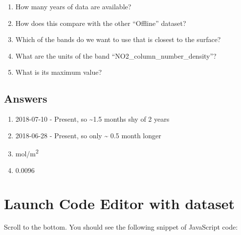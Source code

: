 \documentclass[]{book}
\providecommand{\tightlist}{%
  \setlength{\itemsep}{0pt}\setlength{\parskip}{0pt}}
\begin{document}
\begin{enumerate}
\def\labelenumi{\arabic{enumi}.}
\tightlist
\item
  How many years of data are available?
\item
  How does this compare with the other ``Offline'' dataset?
\item
  Which of the bands do we want to use that is closest to the surface?
\item
  What are the units of the band ``NO2\_column\_number\_density''?
\item
  What is its maximum value?
\end{enumerate}

\hypertarget{answers}{%
\subsection{Answers}\label{answers}}

\begin{enumerate}
\def\labelenumi{\arabic{enumi}.}
\tightlist
\item
  2018-07-10 - Present, so \textasciitilde{}1.5 months shy of 2 years
\item
  2018-06-28 - Present, so only \textasciitilde{} 0.5 month longer
\item
  mol/m\textsuperscript{2}
\item
  0.0096
\end{enumerate}

\hypertarget{launch-code-editor-with-dataset}{%
\section{Launch Code Editor with dataset}\label{launch-code-editor-with-dataset}}

Scroll to the bottom. You should see the following snippet of JavaScript code:
\end{document}
